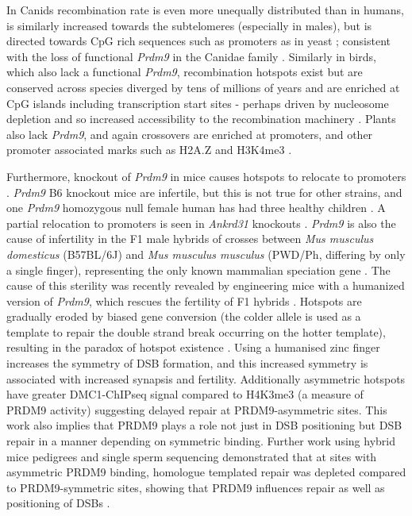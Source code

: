In Canids recombination rate is even more unequally distributed than in humans, is similarly increased towards the subtelomeres (especially in males), but is directed towards CpG rich sequences such as promoters as in yeast \parencite{Auton2013Genetic, Campbell2016PedigreeBased}; consistent with the loss of functional \textit{Prdm9} in the Canidae family \parencite{Munoz-Fuentes2011Prdm9}.
Similarly in birds, which also lack a functional \textit{Prdm9}, recombination hotspots exist but are conserved across species diverged by tens of millions of years and are enriched at CpG islands including transcription start sites - perhaps driven by nucleosome depletion and so increased accessibility to the recombination machinery \parencite{Singhal2015Stable}.
Plants also lack \textit{Prdm9}, and again crossovers are enriched at promoters, and other promoter associated marks such as H2A.Z and H3K4me3 \parencite{Choi2013Arabidopsis, Marand2017Meiotic}.

Furthermore, knockout of \textit{Prdm9} in mice causes hotspots to relocate to promoters \parencite{Brick2012Genetic}.
\textit{Prdm9} B6 knockout mice are infertile, but this is not true for other strains, and one \textit{Prdm9} homozygous null female human has had three healthy children \parencite{Hayashi2005histone, Mihola2019Histone, Narasimhan2016Health}.
A partial relocation to promoters is seen in \textit{Ankrd31} knockouts \parencite{Boekhout2019REC114, Papanikos2018ANKRD31}.
\textit{Prdm9} is also the cause of infertility in the F1 male hybrids of crosses between \textit{Mus musculus domesticus} (B57BL/6J) and \textit{Mus musculus musculus} (PWD/Ph, differing by only a single finger), representing the only known mammalian speciation gene \parencite{Forejt1974Genetic, Mihola2009Mouse}.
The cause of this sterility was recently revealed by engineering mice with a humanized version of \textit{Prdm9}, which rescues the fertility of F1 hybrids \parencite{Davies2016Reengineering}.
Hotspots are gradually eroded by biased gene conversion (the colder allele is used as a template to repair the double strand break occurring on the hotter template), resulting in the paradox of hotspot existence \parencite{Boulton1997hotspot, Coop2007Live, Myers2010Drive, Baker2015PRDM9}.
Using a humanised zinc finger increases the symmetry of DSB formation, and this increased symmetry is associated with increased synapsis and fertility.
Additionally asymmetric hotspots have greater DMC1-ChIPseq signal compared to H4K3me3 (a measure of PRDM9 activity) suggesting delayed repair at PRDM9-asymmetric sites.
This work also implies that PRDM9 plays a role not just in DSB positioning but DSB repair in a manner depending on symmetric binding.
Further work using hybrid mice pedigrees and single sperm sequencing demonstrated that at sites with asymmetric PRDM9 binding, homologue templated repair was depleted compared to PRDM9-symmetric sites, showing that PRDM9 influences repair as well as positioning of DSBs \parencite{Li2019highresolution, Hinch2019Factors}.

